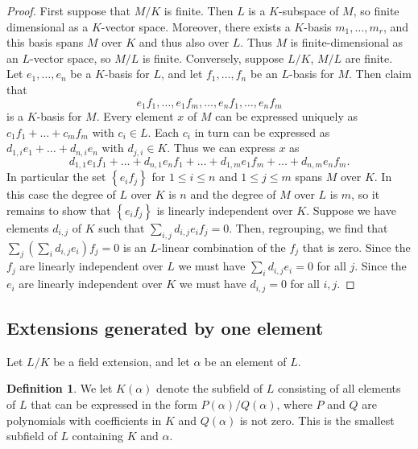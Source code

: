 \documentclass{article}
\newcommand{\rb}[1]{\left( #1 \right)}
\newcommand{\cb}[1]{\left\{ #1 \right\}}
\theoremstyle{definition}\newtheorem{definition}{Definition}[subsection]
\theoremstyle{definition}\newtheorem{remark}[definition]{Remark}
\theoremstyle{definition}\newtheorem*{example}{Example}
\theoremstyle{definition}\newtheorem*{note}{Note}
\begin{document}
\begin{proof}
First suppose that $ M / K $ is finite. Then $ L $ is a $ K $-subspace of $ M $, so finite dimensional as a $ K $-vector space. Moreover, there exists a $ K $-basis $ m_1, \dots, m_r $, and this basis spans $ M $ over $ K $ and thus also over $ L $. Thus $ M $ is finite-dimensional as an $ L $-vector space, so $ M / L $ is finite. Conversely, suppose $ L / K $, $ M / L $ are finite. Let $ e_1, \dots, e_n $ be a $ K $-basis for $ L $, and let $ f_1, \dots, f_n $ be an $ L $-basis for $ M $. Then claim that
$$ e_1f_1, \dots, e_1f_m, \dots, e_nf_1, \dots, e_nf_m $$
is a $ K $-basis for $ M $. Every element $ x $ of $ M $ can be expressed uniquely as $ c_1f_1 + \dots + c_mf_m $ with $ c_i \in L $. Each $ c_i $ in turn can be expressed as $ d_{1, i}e_1 + \dots + d_{n, i}e_n $ with $ d_{j, i} \in K $. Thus we can express $ x $ as
$$ d_{1, 1}e_1f_1 + \dots + d_{n, 1}e_nf_1 + \dots + d_{1, m}e_1f_m + \dots + d_{n, m}e_nf_m. $$
In particular the set $ \cb{e_if_j} $ for $ 1 \le i \le n $ and $ 1 \le j \le m $ spans $ M $ over $ K $. In this case the degree of $ L $ over $ K $ is $ n $ and the degree of $ M $ over $ L $ is $ m $, so it remains to show that $ \cb{e_if_j} $ is linearly independent over $ K $. Suppose we have elements $ d_{i, j} $ of $ K $ such that $ \sum_{i, j} d_{i, j}e_if_j = 0 $. Then, regrouping, we find that $ \sum_j \rb{\sum_i d_{i, j}e_i}f_j = 0 $ is an $ L $-linear combination of the $ f_j $ that is zero. Since the $ f_j $ are linearly independent over $ L $ we must have $ \sum_i d_{i, j}e_i = 0 $ for all $ j $. Since the $ e_i $ are linearly independent over $ K $ we must have $ d_{i, j} = 0 $ for all $ i, j $.
\end{proof}


\subsection{Extensions generated by one element}

Let $ L / K $ be a field extension, and let $ \alpha $ be an element of $ L $.

\begin{definition}
We let $ K\rb{\alpha} $ denote the subfield of $ L $ consisting of all elements of $ L $ that can be expressed in the form $ P\rb{\alpha} / Q\rb{\alpha} $, where $ P $ and $ Q $ are polynomials with coefficients in $ K $ and $ Q\rb{\alpha} $ is not zero. This is the smallest subfield of $ L $ containing $ K $ and $ \alpha $.
\end{definition}
\end{document}
